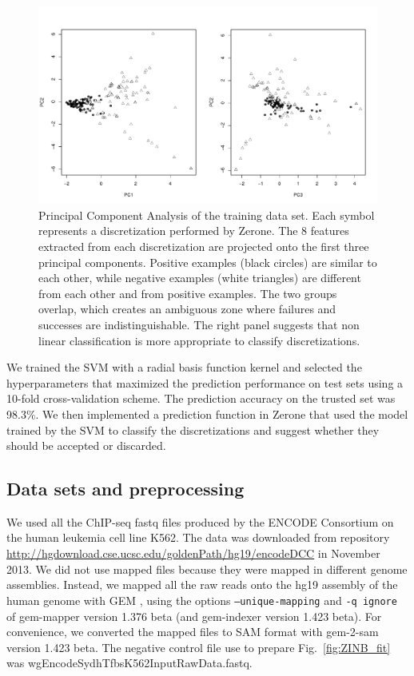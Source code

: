 \documentclass{bioinfo}
\begin{document}
\begin{methods}
\begin{figure}[!tpb]
\centerline{\includegraphics[scale=0.282]{pca_bw.pdf}}
\caption{
  Principal Component Analysis of the training data set.
  Each symbol represents a discretization performed by Zerone. The
  8 features extracted from each discretization are projected onto
  the first three principal components. Positive examples (black
  circles) are similar to each other, while negative examples (white
  triangles) are different from each other and from positive examples.
  The two groups overlap, which creates an ambiguous zone where
  failures and successes are indistinguishable. The right panel
  suggests that non linear classification is more appropriate to
  classify discretizations.
}\label{fig:pca_bw}
\end{figure}

We trained the SVM with a radial basis function kernel and
selected the hyperparameters that maximized the prediction
performance on test sets using a 10-fold cross-validation scheme.
The prediction accuracy on the trusted set was 98.3\%.
We then implemented a prediction function in Zerone that used the
model trained by the SVM to classify the discretizations and
suggest whether they should be accepted or discarded.

\subsection{Data sets and preprocessing}
We used all the ChIP-seq fastq files produced by the ENCODE Consortium
on the human leukemia cell line K562. The data was
downloaded from repository
\href{http://hgdownload.cse.ucsc.edu/goldenPath/hg19/encodeDCC}{http://hgdownload.cse.ucsc.edu/goldenPath/hg19/encodeDCC} in November 2013.
We did not use mapped files because they were mapped in different
genome assemblies.
Instead, we mapped all the raw reads onto the
hg19 assembly of the human genome with GEM \citep{pmid23103880},
using the options \texttt{--unique-mapping} and \texttt{-q ignore} of
gem-mapper version 1.376 beta (and gem-indexer version 1.423 beta).
For convenience, we converted the mapped files to SAM format with
gem-2-sam version 1.423 beta.
The negative control file use to prepare Fig.~\ref{fig:ZINB_fit}
was wgEncodeSydhTfbsK562InputRawData.fastq.


\end{methods}
\end{document}

